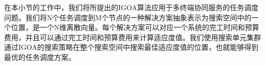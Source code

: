 
在本小节的工作中，我们将所提出的IGOA算法应用于多终端协同服务的任务调度问题。我们将N个任务调度到M个节点的一种解决方案抽象表示为搜索空间中的一个位置，是一个N维离散向量。每个解决方案可以对应一个系统的完工时间和预算费用，并且可以通过完工时间和预算费用来计算适应度值。我们使用搜索单元集群通过IGOA的搜索策略在整个搜索空间中搜索最佳适应度值的位置，也就能够得到最优的任务调度方案。

